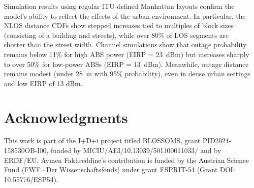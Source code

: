 \documentclass[10pt,conference]{IEEEtran}
\begin{document}
Simulation results using regular ITU-defined Manhattan layouts confirm the model's ability to reflect the effects of the urban environment. In particular, the NLOS distance CDFs show stepped increases tied to multiples of block sizes (consisting of a building and streets), while over 80\% of LOS segments are shorter than the street width. Channel simulations show that outage probability remains below 11\% for high ABS power (EIRP = 23~dBm) but increases sharply to over 50\% for low-power ABSs (EIRP = 13~dBm). Meanwhile, outage distance remains modest (under 28~m with 95\% probability), even in dense urban settings and low EIRP of 13 dBm.
\section*{Acknowledgments}
This work is part of the I+D+i project titled BLOSSOMS, grant PID2024-158530OB-I00, funded by MICIU/AEI/10.13039/501100011033/ and by ERDF/EU. Aymen Fakhreddine's contribution is funded by the Austrian Science Fund (FWF\,--\,Der Wissenschaftsfonds) under grant ESPRIT-54 (Grant DOI: 10.55776/ESP54).



\end{document}
